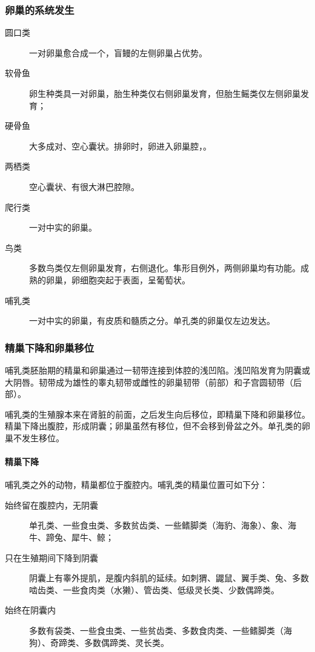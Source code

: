 \subsubsection{卵巢的系统发生}

\begin{description}
	\item[圆口类] 一对卵巢愈合成一个，盲鳗的左侧卵巢占优势。
	\item[软骨鱼] 卵生种类具一对卵巢，胎生种类仅右侧卵巢发育，但胎生鳐类仅左侧卵巢发育；
	\item[硬骨鱼] 大多成对、空心囊状。排卵时，卵进入卵巢腔，。
	\item[两栖类] 空心囊状、有很大淋巴腔隙。
	\item[爬行类] 一对中实的卵巢。
	\item[鸟类] 多数鸟类仅左侧卵巢发育，右侧退化。隼形目例外，两侧卵巢均有功能。成熟的卵巢，卵细胞突起于表面，呈葡萄状。
	\item[哺乳类] 一对中实的卵巢，有皮质和髓质之分。单孔类的卵巢仅左边发达。
\end{description}

\subsubsection{精巢下降和卵巢移位}

哺乳类胚胎期的精巢和卵巢通过一韧带连接到体腔的浅凹陷。浅凹陷发育为阴囊或大阴唇。韧带成为雄性的睾丸韧带或雌性的卵巢韧带（前部）和子宫圆韧带（后部）。

哺乳类的生殖腺本来在肾脏的前面，之后发生向后移位，即精巢下降和卵巢移位。精巢下降出腹腔，形成阴囊；卵巢虽然有移位，但不会移到骨盆之外。单孔类的卵巢不发生移位。

\paragraph{精巢下降}

哺乳类之外的动物，精巢都位于腹腔内。哺乳类的精巢位置可如下分：
\begin{description}
	\item[始终留在腹腔内，无阴囊] 单孔类、一些食虫类、多数贫齿类、一些鳍脚类（海豹、海象）、象、海牛、蹄兔、犀牛、鲸；
	\item[只在生殖期间下降到阴囊] 阴囊上有睾外提肌，是腹内斜肌的延续。如刺猬、鼹鼠、翼手类、兔、多数啮齿类、一些食肉类（水獭）、管齿类、低级灵长类、少数偶蹄类。
	\item[始终在阴囊内] 多数有袋类、一些食虫类、一些贫齿类、多数食肉类、一些鳍脚类（海狗）、奇蹄类、多数偶蹄类、灵长类。
\end{description}

